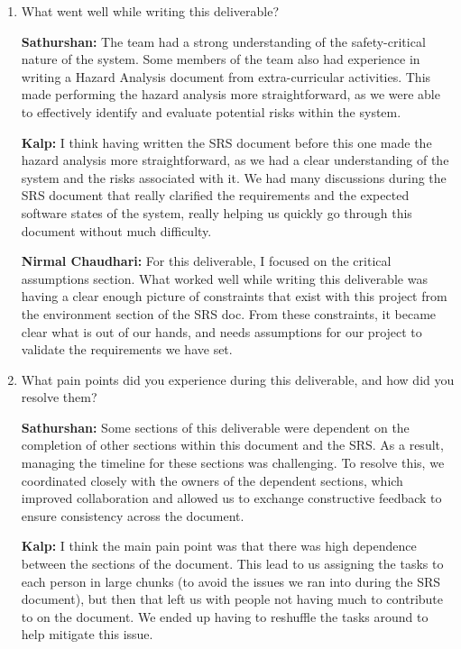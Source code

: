 \documentclass{article}
\begin{document}
\begin{enumerate}
    \item What went well while writing this deliverable? 
    
    \textbf{Sathurshan:} The team had a strong understanding of the
    safety-critical nature of the system. Some members of the team also had
    experience in writing a Hazard Analysis document from extra-curricular
    activities. This made performing the hazard analysis more straightforward,
    as we were able to effectively identify and evaluate potential risks within
    the system.

    \textbf{Kalp:} I think having written the SRS document before this one made
    the hazard analysis more straightforward, as we had a clear understanding of
    the system and the risks associated with it. We had many discussions during
    the SRS document that really clarified the requirements and the expected 
    software states of the system, really helping us quickly go through this 
    document without much difficulty.
    
    \textbf{Nirmal Chaudhari:} For this deliverable, I focused on the critical
    assumptions section. What worked well while writing this deliverable was 
    having a clear enough picture of constraints that exist with this project 
    from the environment section of the SRS doc. From these constraints, it 
    became clear what is out of our hands, and needs assumptions for our project 
    to validate the requirements we have set. 

    \item What pain points did you experience during this deliverable, and how
    did you resolve them?

    \textbf{Sathurshan:} Some sections of this deliverable were dependent on the
    completion of other sections within this document and the SRS. As a result,
    managing the timeline for these sections was challenging. To resolve this,
    we coordinated closely with the owners of the dependent sections, which
    improved collaboration and allowed us to exchange constructive feedback to
    ensure consistency across the document.

    \textbf{Kalp:} I think the main pain point was that there was high 
    dependence between the sections of the document. This lead to us assigning
    the tasks to each person in large chunks (to avoid the issues we ran into 
    during the SRS document), but then that left us with people not having much
    to contribute to on the document. We ended up having to reshuffle the tasks
    around to help mitigate this issue. 
    

\end{enumerate}
\end{document}
